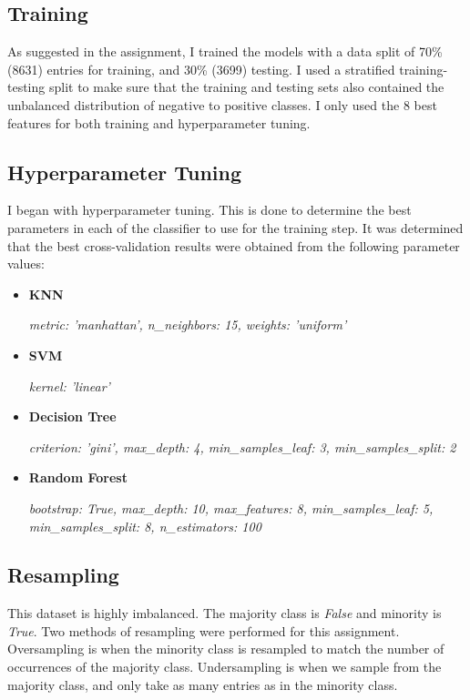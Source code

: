 \documentclass{article}
\begin{document}
\subsection{Training}

As suggested in the assignment, I trained the models with a data split of 70\% (8631) entries for training, and 30\% (3699) testing. I used a stratified training-testing split to make sure that the training and testing sets also contained the unbalanced distribution of negative to positive classes. I only used the 8 best features for both training and hyperparameter tuning. 

\subsection{Hyperparameter Tuning}

I began with hyperparameter tuning. This is done to determine the best parameters in each of the classifier to use for the training step. It was determined that the best cross-validation results were obtained from the following parameter values:

\begin{itemize}

\item{}
\textbf{KNN} 

\emph{metric: 'manhattan', n\_neighbors: 15, weights: 'uniform'}

\item{}
\textbf{SVM}

\emph{kernel: 'linear'}

\item{}
\textbf{Decision Tree} 

\emph{criterion: 'gini', max\_depth: 4, min\_samples\_leaf: 3, min\_samples\_split: 2}

\item{}
\textbf{Random Forest}

\emph{bootstrap: True, max\_depth: 10, max\_features: 8, min\_samples\_leaf: 5, min\_samples\_split: 8, n\_estimators: 100}

\end{itemize}

\subsection{Resampling}

This dataset is highly imbalanced. The majority class is \emph{False} and minority is \emph{True}. Two methods of resampling were performed for this assignment. Oversampling is when the minority class is resampled to match the number of occurrences of the majority class. Undersampling is when we sample from the majority class, and only take as many entries as in the minority class.  
\end{document}
